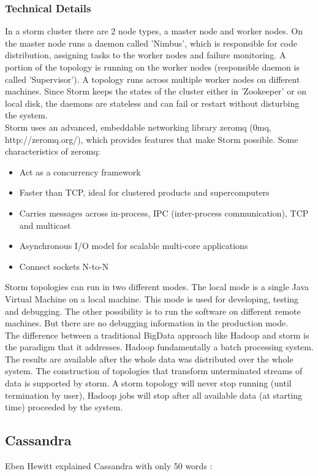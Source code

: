 \documentclass[a4paper]{article}
\begin{document}
\subsubsection{Technical Details}
In a storm cluster there are 2 node types, a master node and worker nodes. On the master node runs a daemon called 'Nimbus', which is responsible for code distribution, assigning tasks to the worker nodes and failure monitoring. A portion of the topology is running on the worker nodes (responsible daemon is called 'Supervisor'). A topology runs across multiple worker nodes on different machines. Since Storm keeps the states of the cluster either in 'Zookeeper' or on local disk, the daemons are stateless and can fail or restart without disturbing the system.\\
Storm uses an advanced, embeddable networking library zeromq (0mq, http://zeromq.org/), which provides features that make Storm possible. Some characteristics of zeromq:
\begin{itemize}
	\item Act as a concurrency framework
	\item Faster than TCP, ideal for clustered products and supercomputers
	\item Carries messages across in-process, IPC (inter-process communication), TCP and multicast
	\item Asynchronous I/O model for scalable multi-core applications
	\item Connect sockets N-to-N 
\end{itemize}
Storm topologies can run in two different modes. The local mode is a single Java Virtual Machine on a local machine. This mode is used for developing, testing and debugging. The other possibility is to run the software on different remote machines. But there are no debugging information in the production mode.\\

The difference between a traditional BigData approach like Hadoop and storm is the paradigm that it addresses. Hadoop fundamentally a batch processing system. The results are available after the whole data was distributed over the whole system. The construction of topologies that transform unterminated streams of data is supported by storm. A storm topology will never stop running (until termination by user), Hadoop jobs will stop after all available data (at starting time) proceeded by the system.

\subsection{Cassandra}
Eben Hewitt explained Cassandra with only 50 words \cite{hewitt2010cassandra}:\\
\end{document}
